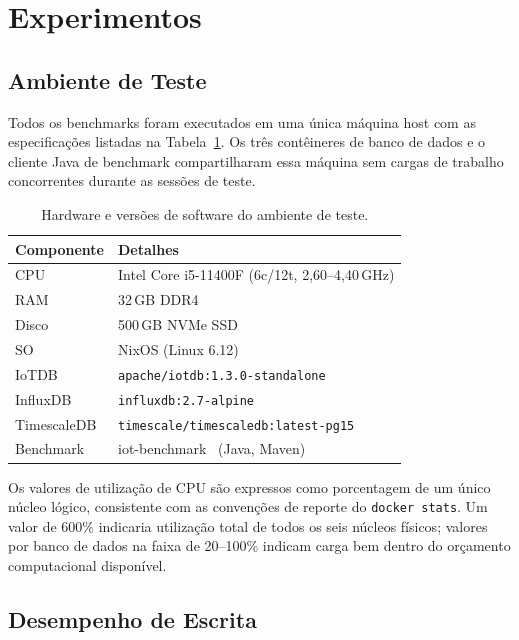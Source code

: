 \section{Experimentos}
\label{sec:experiments}

\subsection{Ambiente de Teste}

Todos os benchmarks foram executados em uma única máquina host com as especificações listadas
na Tabela~\ref{tab:hardware}. Os três contêineres de banco de dados e o cliente Java de
benchmark compartilharam essa máquina sem cargas de trabalho concorrentes durante as sessões
de teste.

\begin{table}[t]
  \centering
  \caption{Hardware e versões de software do ambiente de teste.}
  \label{tab:hardware}
  \begin{tabular}{ll}
    \hline
    \textbf{Componente} & \textbf{Detalhes} \\
    \hline
    CPU       & Intel Core i5-11400F (6c/12t, 2,60--4,40\,GHz) \\
    RAM       & 32\,GB DDR4 \\
    Disco     & 500\,GB NVMe SSD \\
    SO        & NixOS (Linux 6.12) \\
    \hline
    IoTDB       & \texttt{apache/iotdb:1.3.0-standalone} \\
    InfluxDB    & \texttt{influxdb:2.7-alpine} \\
    TimescaleDB & \texttt{timescale/timescaledb:latest-pg15} \\
    Benchmark   & iot-benchmark~\cite{iotbenchmark} (Java, Maven) \\
    \hline
  \end{tabular}
\end{table}

Os valores de utilização de CPU são expressos como porcentagem de um único núcleo lógico,
consistente com as convenções de reporte do \texttt{docker stats}. Um valor de 600\% indicaria
utilização total de todos os seis núcleos físicos; valores por banco de dados na faixa de
20--100\% indicam carga bem dentro do orçamento computacional disponível.

\subsection{Desempenho de Escrita}
\label{sec:write-results}

